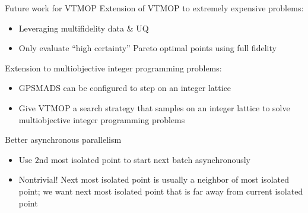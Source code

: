 \documentclass[xcolor=dvipsnames]{beamer}
\begin{document}
\begin{frame}{Future work for VTMOP}
Extension of VTMOP to extremely expensive problems:
\begin{itemize}
\item Leveraging multifidelity data \& UQ
\item Only evaluate ``high certainty'' Pareto optimal points using full fidelity
\end{itemize}
Extension to multiobjective integer programming problems:
\begin{itemize}
\item GPSMADS can be configured to step on an integer lattice
\item Give VTMOP a search strategy that samples on an integer lattice to
solve multiobjective integer programming problems
\end{itemize}
Better asynchronous parallelism
\begin{itemize}
\item Use $2$nd most isolated point to start next batch
asynchronously
\item Nontrivial! Next most isolated point is usually a neighbor of most
isolated point; we want next most isolated point that is far away
from current isolated point
\end{itemize}
\end{frame}
\end{document}
